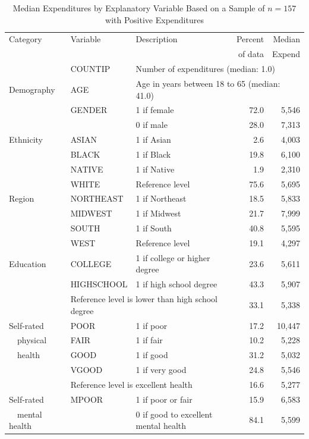 \newpage
\begin{table}[h]\begin{center}
\caption{\label{T13:MEPSSumStats} Median Expenditures by Explanatory
Variable \newline Based on a Sample of $n=157$ with Positive
Expenditures} 
\begin{tabular}{lllrr}
\hline
Category & Variable & Description & Percent & Median \\
&  &  & of data & Expend \\ \hline
& COUNTIP& \multicolumn{3}{l}{Number of expenditures (median: 1.0)} \\
Demography & AGE & \multicolumn{3}{l}{Age in years between 18 to 65 (median: 41.0)} \\
& GENDER & 1 if female & 72.0 & 5,546 \\
&  & 0 if male & 28.0 & 7,313 \\
Ethnicity & ASIAN & 1 if Asian & 2.6 & 4,003 \\
& BLACK & 1 if Black & 19.8 & 6,100\\
& NATIVE & 1 if Native & 1.9 & 2,310\\
& WHITE & Reference level & 75.6 & 5,695\\
Region & NORTHEAST & 1 if Northeast & 18.5 & 5,833 \\
& MIDWEST & 1 if Midwest & 21.7  &  7,999 \\
& SOUTH & 1 if South & 40.8  &  5,595 \\
& WEST & Reference level & 19.1  &  4,297\\ \hline Education &
COLLEGE
& 1 if college or higher degree & 23.6 &  5,611\\
& HIGHSCHOOL & 1 if high school degree & 43.3 & 5,907  \\
& \multicolumn{2}{l}{Reference level is lower than high school
degree} & 33.1  &  5,338 \\ \hline
Self-rated & POOR & 1 if poor & 17.2 & 10,447\\
\ \ physical& FAIR & 1 if fair & 10.2 & 5,228 \\
\ \ health & GOOD & 1 if good & 31.2 & 5,032\\
& VGOOD & 1 if very good & 24.8 &  5,546 \\
&   \multicolumn{2}{l}{Reference level is excellent health} &16.6 & 5,277 \\
Self-rated & MPOOR & 1 if poor or fair & 15.9  & 6,583  \\
\ \ mental health &  & 0 if good to excellent mental health & 84.1 & 5,599 \\

\end{tabular}
\end{center}
\end{table}
